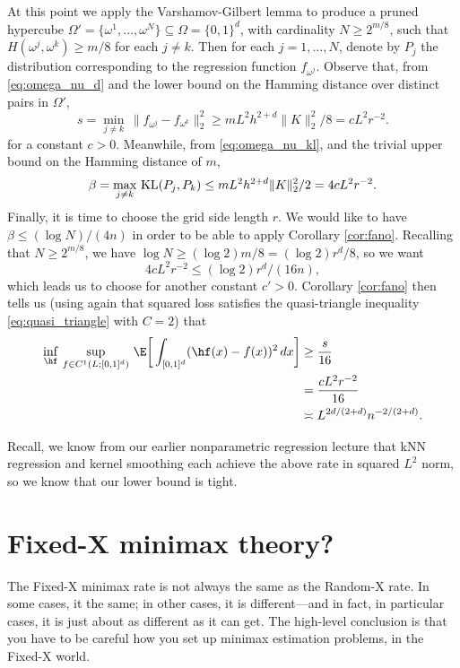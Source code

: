 \documentclass{article}
\begin{document}
At this point we apply the Varshamov-Gilbert lemma to produce a pruned hypercube
$\Omega' = \{\omega^1,\dots,\omega^N \} \subseteq \Omega = \{0,1\}^d$, with
cardinality $N \geq 2^{m/8}$, such that $H(\omega^j,\omega^k) \geq m/8$ for each
$j \not= k$. Then for each $j=1,\dots,N$, denote by $P_j$ the distribution
corresponding to the regression function $f_{\omega^j}$. Observe that, from 
\eqref{eq:omega_nu_d} and the lower bound on the Hamming distance over distinct
pairs in $\Omega'$,
\[
s = \min_{j \not= k} \, \| f_{\omega^j} - f_{\omega^k} \|_2^2 
\geq m L^2 h^{2+d} \|K\|_2^2 / 8 = c L^2 r^{-2}. 
\]
for a constant $c>0$. Meanwhile, from \eqref{eq:omega_nu_kl}, and the trivial
upper bound on the Hamming distance of $m$,
\[
\beta = \max_{j \not= k} \, \mathrm{KL}(P_j,P_k) \leq m L^2 h^{2+d} \|K\|_2^2 / 2 
= 4c L^2 r^{-2}.
\]
Finally, it is time to choose the grid side length $r$. We would like to have
$\beta \leq (\log N)/(4n)$ in order to be able to apply Corollary
\ref{cor:fano}. Recalling that $N \geq 2^{m/8}$, we have $\log N \geq (\log 2) m
/ 8 = (\log 2) r^d / 8$, so we want
\[
4c L^2 r^{-2} \leq (\log 2) r^d / (16n),
\]
which leads us to choose  for
another constant $c'>0$. Corollary \ref{cor:fano} then tells us (using again
that squared loss satisfies the quasi-triangle inequality
\eqref{eq:quasi_triangle} with $C=2$) that 
\begin{align*}
\inf_{\hf} \, \sup_{f \in C^1(L; [0,1]^d)} \, \E \bigg[ \int_{[0,1]^d} (\hf(x) -
  f(x))^2 \, dx \bigg] 
&\geq \frac{s}{16} \\
&= \frac{cL^2 r^{-2}}{16} \\
&\asymp L^{2d/(2+d)} n^{-2/(2+d)}.
\end{align*}  

Recall, we know from our earlier nonparametric regression lecture that kNN
regression and kernel smoothing each achieve the above rate in squared $L^2$ 
norm, so we know that our lower bound is tight.  

\section{Fixed-X minimax theory?}

The Fixed-X minimax rate is not always the same as the Random-X rate. In some
cases, it the same; in other cases, it is different---and in fact, in particular 
cases, it is just about as different as it can get. The high-level conclusion is
that you have to be careful how you set up minimax estimation problems, in the
Fixed-X world.
\end{document}
